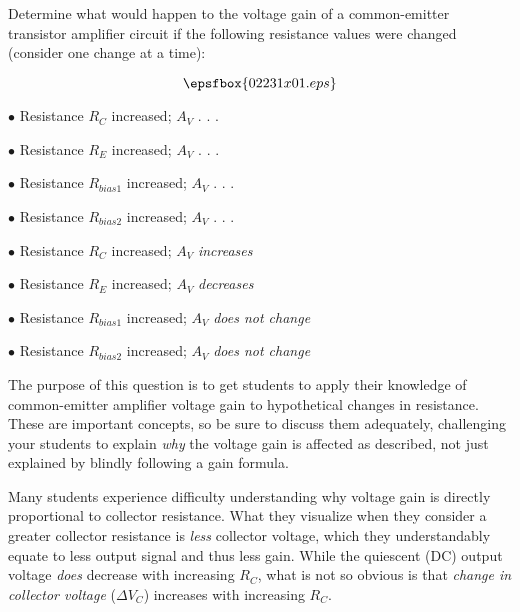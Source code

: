 

Determine what would happen to the voltage gain of a common-emitter transistor amplifier circuit if the following resistance values were changed (consider one change at a time):

$$\epsfbox{02231x01.eps}$$

\medskip
\goodbreak
\item{$\bullet$} Resistance $R_C$ increased; $A_V$ . . .
\item{$\bullet$} Resistance $R_E$ increased; $A_V$ . . .
\item{$\bullet$} Resistance $R_{bias1}$ increased; $A_V$ . . .
\item{$\bullet$} Resistance $R_{bias2}$ increased; $A_V$ . . .
\medskip







\medskip
\goodbreak
\item{$\bullet$} Resistance $R_C$ increased; $A_V$ {\it increases}
\item{$\bullet$} Resistance $R_E$ increased; $A_V$ {\it decreases}
\item{$\bullet$} Resistance $R_{bias1}$ increased; $A_V$ {\it does not change}
\item{$\bullet$} Resistance $R_{bias2}$ increased; $A_V$ {\it does not change}
\medskip







The purpose of this question is to get students to apply their knowledge of common-emitter amplifier voltage gain to hypothetical changes in resistance.  These are important concepts, so be sure to discuss them adequately, challenging your students to explain {\it why} the voltage gain is affected as described, not just explained by blindly following a gain formula.

Many students experience difficulty understanding why voltage gain is directly proportional to collector resistance.  What they visualize when they consider a greater collector resistance is {\it less} collector voltage, which they understandably equate to less output signal and thus less gain.  While the quiescent (DC) output voltage {\it does} decrease with increasing $R_C$, what is not so obvious is that {\it change in collector voltage} ($\Delta V_C$) increases with increasing $R_C$.

